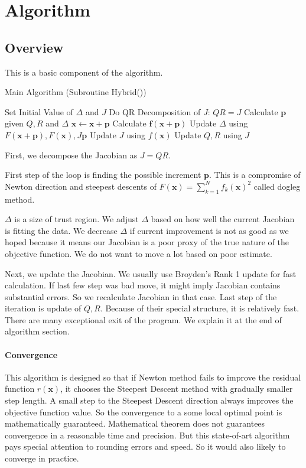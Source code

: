 \documentclass[12pt]{article}
\def\xb{{\mathbf{x}}}
\def\fb{{\mathbf{f}}}
\def\pb{{\mathbf{p}}}
\begin{document}
\section{Algorithm}
\subsection{Overview}
This is a basic component of the algorithm. 
\begin{algorithm}[ht]
\caption{Main Algorithm (Subroutine Hybrid())}
\label{al:main}
\begin{algorithmic}[1]
\STATE Set Initial Value of $\Delta$ and $J$
\STATE Do QR Decomposition of $J$: $QR = J$
\WHILE{$\text{abs}(F(\xb))>tol$}
	\STATE Calculate $\pb$ given $Q,R$ and $\Delta$ 
	\IF{$F(\xb+\pb)<F(\xb)$} \label{ln:improvedF}
		\STATE $\xb\leftarrow \xb+\pb$
		\STATE Calculate $\fb(\xb+\pb)$
	\ENDIF
	\STATE Update $\Delta$ using $F(\xb+\pb),F(\xb),J\pb$
	\STATE Update $J$ using $f(\xb)$
	\STATE Update $Q,R$ using $J$
\ENDWHILE
\end{algorithmic}
\end{algorithm}
First, we decompose the Jacobian as $J = QR$. 

First step of the loop is finding the possible increment $\pb$. This is a compromise of Newton
direction and steepest descents of $F(\xb)=\sum_{k=1}^Nf_k(\xb)^2$ called dogleg method.

$\Delta $ is a size of trust region.  We adjust $\Delta$ based on how well the current Jacobian is
fitting the data. We decrease $\Delta$ if current improvement is not as good as we hoped because
it means our Jacobian is a poor proxy of the true nature of the objective function. We do not want
to move a lot based on poor estimate.  

Next, we update the Jacobian. We usually use Broyden's Rank 1 update for fast calculation. If last
few step was bad move, it might imply Jacobian contains substantial errors. So we recalculate
Jacobian in that case. Last step of the iteration is update of $Q, R$.  Because of their special
structure, it is relatively fast. There are many exceptional exit of the program. We explain it at
the end of algorithm section.

\paragraph{Convergence} 
This algorithm is designed so that if Newton method fails to improve the residual function
$r(\xb)$, it chooses the Steepest Descent method with gradually smaller step length. A small step
to the Steepest Descent direction always improves the objective function value. So the convergence
to a some local optimal point is mathematically guaranteed. Mathematical theorem does not
guarantees convergence in a reasonable time and precision. But this state-of-art algorithm pays
special attention to rounding errors and speed. So it would also likely to converge in practice.
\end{document}

